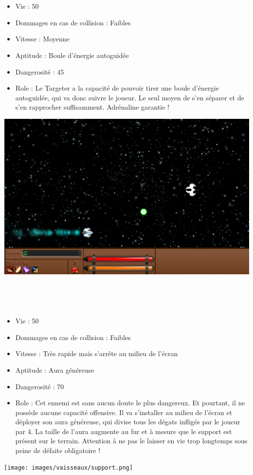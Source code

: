 				\par~
				\item[$\bullet$ Targeter]
				\par~
				\begin{itemize}
					\item Vie : 50
					\item Dommages en cas de collision : Faibles
					\item Vitesse : Moyenne
					\item Aptitude : Boule d'énergie autoguidée
					\item Dangerosité : 45%
					\item Role : Le Targeter a la capacité de pouvoir tirer une boule d'énergie autoguidée, qui va donc suivre le joueur. Le seul moyen de s'en séparer et de s'en rapprocher suffisamment. Adrénaline garantie !
				\end{itemize}
\includegraphics{images/vaisseaux/targeter.png}
				\par~
				\item[$\bullet$ Support]
				\par~
				\begin{itemize}
					\item Vie : 50
					\item Dommages en cas de collision : Faibles
					\item Vitesse : Très rapide mais s'arrête au milieu de l'écran
					\item Aptitude : Aura généreuse
					\item Dangerosité : 70%
					\item Role : Cet ennemi est sans aucun doute le plus dangereux. Et pourtant, il ne possède aucune capacité offensive. Il va s'installer au milieu de l'écran et déployer son aura généreuse, qui divise tous les dégats infligés par le joueur par 4. La taille de l'aura augmente au fur et à mesure que le support est présent sur le terrain. Attention à ne pas le laisser en vie trop longtemps sous peine de défaite obligatoire !
				\end{itemize}
\texttt{[image: images/vaisseaux/support.png]}
				\par~